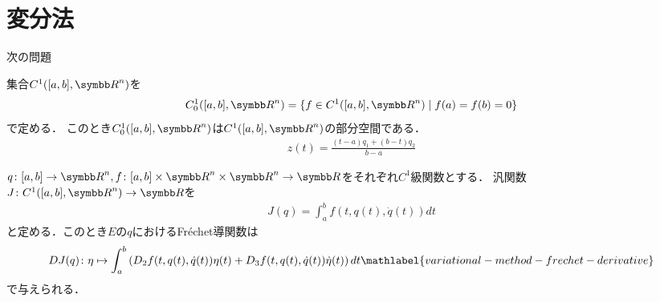 \documentclass{ltjsarticle}
\begin{document}
\section{変分法}
次の問題

集合\(C^1([a, b], {\Real}^n)\)を
\begin{align*}
    C^1_0([a, b], {\Real}^n) = \{f \in C^1([a, b], {\Real}^n) \mid f(a) = f(b) = 0\}
\end{align*}
で定める．
このとき\(C^1_0([a, b], {\Real}^n)\)は\(C^1([a, b], {\Real}^n)\)の部分空間である．
\begin{align*}
    z(t) = \frac{(t - a)q_1 + (b - t)q_2}{b - a}
\end{align*}

\begin{thmbox}
\begin{proposition}
\(q \colon [a, b] \to {\Real}^n, f \colon [a, b] \times {\Real}^n \times {\Real}^n \to {\Real}\)をそれぞれ\(C^1\)級関数とする．
汎関数\(J \colon C^1([a, b], {\Real}^n) \to {\Real}\)を
\begin{align*}
    J(q) = \int_a^b f(t, q(t), \dot{q}(t)) dt
\end{align*}
と定める．このとき\(E\)の\(q\)におけるFréchet導関数は
\begin{align}
    DJ(q) \colon \eta \mapsto \int_a^b \left( D_2 f(t, q(t), \dot{q}(t)) \eta(t)  + D_3 f(t, q(t), \dot{q}(t)) \dot{\eta}(t) \right) dt \mathlabel{variational-method-frechet-derivative}
\end{align}
で与えられる．
\end{proposition}
\end{thmbox}
\end{document}
